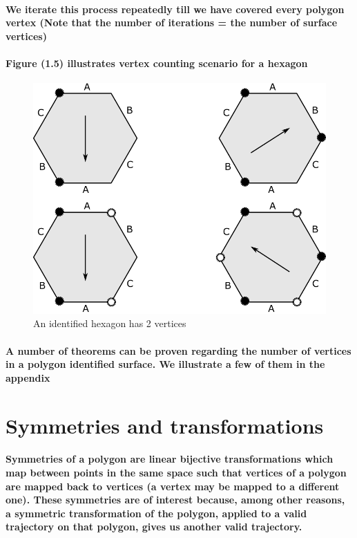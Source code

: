 \documentclass{report}
\begin{document}
\paragraph{We iterate this process repeatedly till we have covered every polygon vertex (Note that the number of iterations = the number of surface vertices)}

\paragraph{Figure (1.5) illustrates vertex counting scenario for a hexagon}

\begin{figure} 
\begin{center}
\includegraphics[scale=0.3]{5}
\caption{An identified hexagon has 2 vertices}
\end{center}
\end{figure}

\paragraph{A number of theorems can be proven regarding the number of vertices in a polygon identified surface. We illustrate a few of them in the appendix}


\section{Symmetries and transformations}

\paragraph{Symmetries of a polygon are linear bijective transformations which map between points in the same space such that vertices of a polygon are mapped back to vertices (a vertex may be mapped to a different one). 
These symmetries are of interest because, among other reasons, a symmetric transformation of the polygon, applied to a valid trajectory on that polygon, gives us another valid trajectory.}
\end{document}
